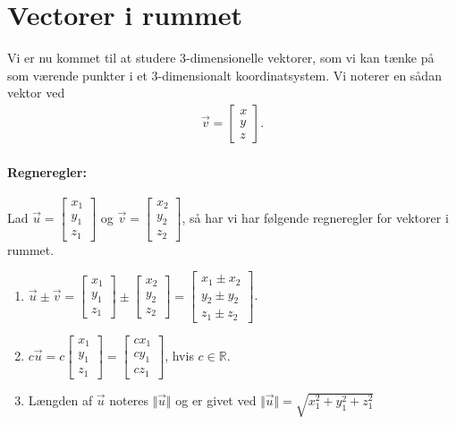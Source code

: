 \section{Vectorer i rummet}
\noindent Vi er nu kommet til at studere 3-dimensionelle vektorer, som vi kan tænke på som værende punkter i et 3-dimensionalt koordinatsystem. Vi noterer en sådan vektor ved
\begin{align*}
\vec{v}=\begin{bmatrix}
x \\
y \\
z
\end{bmatrix}.
\end{align*}
\paragraph*{Regneregler:}
Lad $\vec{u} = \begin{bmatrix} x_1 \\ y_1 \\ z_1 \end{bmatrix}$ og $\vec{v} = \begin{bmatrix} x_2 \\ y_2 \\ z_2 \end{bmatrix}$, så har vi har følgende regneregler for vektorer i rummet.
\begin{enumerate}
\item $\displaystyle \vec{u} \pm \vec{v} = \begin{bmatrix} x_1 \\ y_1 \\ z_1 \end{bmatrix} \pm \begin{bmatrix} x_2 \\ y_2 \\ z_2 \end{bmatrix} = \begin{bmatrix} x_1 \pm x_2 \\ y_2 \pm y_2 \\ z_1 \pm z_2 \end{bmatrix} $.
\item $\displaystyle c \vec{u} = c  \begin{bmatrix} x_1 \\y_1 \\ z_1 \end{bmatrix} = \begin{bmatrix} cx_1 \\ c y_1 \\ cz_1 \end{bmatrix}$, hvis $c \in \mathbb{R}$.
\item Længden af $\vec{u}$ noteres $\Vert \vec{u} \Vert$ og er givet ved $\displaystyle \Vert \vec{u} \Vert = \sqrt{x_1^2+y_1^2+z_1^2}$
\end{enumerate}

